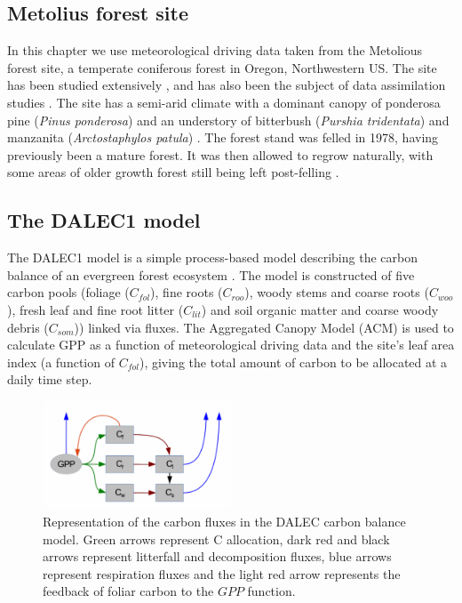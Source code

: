 \subsection{Metolius forest site} \label{chap5:sec:oregon}
In this chapter we use meteorological driving data taken from the Metolious forest site, a temperate coniferous forest in Oregon, Northwestern US. The site has been studied extensively \citep{law2001carbon}, and has also been the subject of data assimilation studies \citep{williams2005improved, Quaife2008}. The site has a semi-arid climate with a dominant canopy of ponderosa pine (\textit{Pinus ponderosa}) and an understory of bitterbush (\textit{Purshia tridentata}) and manzanita (\textit{Arctostaphylos patula}) \citep{law2001estimation}. The forest stand was felled in 1978, having previously been a mature forest. It was then allowed to regrow naturally, with some areas of older growth forest still being left post-felling \citep{williams2005improved}.

\subsection{The DALEC1 model} \label{chap5:sec:dalec1}

The DALEC1 model is a simple process-based model describing the carbon balance of an evergreen forest ecosystem \cite{williams2005improved}. The model is constructed of five carbon pools (foliage ($C_{fol}$), fine roots ($C_{roo}$), woody stems and coarse roots ($C_{woo}$), fresh leaf and fine root litter ($C_{lit}$) and soil organic matter and coarse woody debris ($C_{som}$)) linked via fluxes. The Aggregated Canopy Model (ACM) is used to calculate GPP as a function of meteorological driving data and the site's leaf area index (a function of $C_{fol}$), giving the total amount of carbon to be allocated at a daily time step.   

\begin{figure}[ht]
    \centering
    \includegraphics[width=0.5\textwidth]{chapter/chapter5/DALECpic.png}
    \caption{Representation of the carbon fluxes in the DALEC carbon balance model. Green arrows represent C allocation, dark red and black arrows represent litterfall and decomposition fluxes, blue arrows represent respiration fluxes and the light red arrow represents the feedback of foliar carbon to the $GPP$ function. \cite{delahaies2013regularization}}
    \label{fig:DALEC_mod}
\end{figure}

